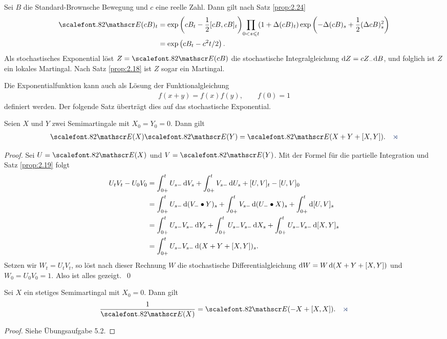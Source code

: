 \begin{ex}
Sei $B$ die Standard-Brownsche Bewegung und $c$ eine reelle Zahl. Dann
gilt nach Satz \ref{prop:2.24}
\begin{align*}
\Ep(cB)_t &= \exp\left(cB_t - \frac{1}{2}[cB,cB]_t\right)\!\prod_{0 < s \le t}\!
(1+\Delta (cB)_t)\exp\left(-\Delta(cB)_s + \frac{1}{2}(\Delta cB)_s^2\right)\\
&= \exp\left(cB_t - {c^2 t}/{2}\right).
\end{align*}
Als stochastisches Exponential löst $Z=\Ep(cB)$ die stochastische
Integralgleichung $\mathrm{d} Z = c Z_- \mathrm{d} B$, und folglich ist $Z$ ein lokales
Martingal. Nach Satz \ref{prop:2.18} ist $Z$ sogar ein Martingal.\bsp
\end{ex}

Die Exponentialfunktion kann auch als Lösung der Funktionalgleichung
\begin{align*}
f(x+y) = f(x)f(y),\qquad f(0) = 1
\end{align*}
definiert werden. Der folgende Satz überträgt dies auf das stochastische
Exponential.

\begin{theorem}
\label{prop:2.26}
Seien $X$ und $Y$ zwei Semimartingale mit $X_0=Y_0=0$. Dann gilt
\begin{align*}
\Ep(X)\Ep(Y) = \Ep(X+Y+[X,Y]).\fish
\end{align*}
\end{theorem}
\begin{proof}
Sei $U= \Ep(X)$ und $V= \Ep(Y)$. Mit der Formel für die partielle Integration
und Satz \ref{prop:2.19} folgt
\begin{align*}
U_t V_t - U_0V_0 &= \int_{0+}^t U_{s-}\,\mathrm{d} V_s  +
\int_{0+}^t V_{s-}\,\mathrm{d} U_s + [U,V]_t - [U,V]_0\\
&= \int_{0+}^t U_{s-}\,\mathrm{d}(V_-\bullet Y)_s + 
\int_{0+}^t V_{s-}\, \mathrm{d} (U_-\bullet X)_s +
\int_{0+}^t \mathrm{d} [U,V]_s\\
&= \int_{0+}^t U_{s-}V_{s-}\, \mathrm{d} Y_s +
\int_{0+}^t U_{s-}V_{s-}\, \mathrm{d} X_s 
+
\int_{0+}^t U_{s-}V_{s-}\,\mathrm{d} [X,Y]_s\\
&= \int_{0+}^t U_{s-}V_{s-}\, \mathrm{d}(X+Y+[X,Y] )_s.
\end{align*}
Setzen wir $W_t = U_tV_t$, so löst nach dieser Rechnung $W$ die stochastische
Differentialgleichung $\mathrm{d} W = W\,\mathrm{d}(X+Y+[X,Y])$ und $W_0 = U_0V_0 = 1$.
Also ist alles gezeigt.~\qed
\end{proof}

\begin{korollar}
Sei $X$ ein stetiges Semimartingal mit $X_0=0$. Dann gilt
\begin{align*}
\frac{1}{\Ep(X)} = \Ep(-X+[X,X]).\fish
\end{align*}
\end{korollar}
\begin{proof}
Siehe Übungsaufgabe 5.2.\fish
\end{proof}

